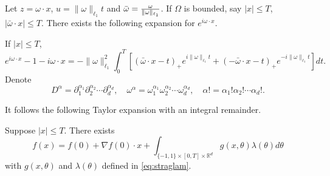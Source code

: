 Let $z=\omega\cdot x$, $u=\|\omega\|_{\ell_1}t$ and $\bar \omega={\omega\over \|\omega\|_{\ell_1}}$. If $\Omega$ is bounded, say $|x|\le T$, $|\bar \omega \cdot x|\le T$. There exists the following expansion for $e^{i\omega\cdot x}$.
\begin{lemma}\label{lm:talorcomplex}
If $|x|\le T$,
\begin{equation}  
e^{i\omega\cdot x} - 1 -  i\omega\cdot x 
= 
- \|\omega\|_{\ell_1}^2\int_{0}^T\left[(\bar \omega\cdot x - t)_+e^{i\|\omega\|_{\ell_1}t}
+ (-\bar \omega\cdot x - t)_+e^{-i\|\omega\|_{\ell_1}t} \right]dt.
\end{equation} 
Denote 
$$
D^\alpha = \partial_1^{\alpha_1}\partial_2^{\alpha_2}\cdots \partial_d^{\alpha_d},\quad \omega^\alpha = \omega_1^{\alpha_1}\omega_2^{\alpha_2}\cdots \omega_d^{\alpha_d},\quad \alpha!=\alpha_1!\alpha_2!\cdots \alpha_d!.
$$
\end{lemma}
It follows  the following Taylor expansion with an integral remainder.
\begin{lemma}\label{lm:probabilityexpan}
Suppose $|x|\le T$. There exists
\begin{equation}
f(x) = f(0) + \nabla f(0)\cdot x
+  \int_{\{-1,1\}\times [0,T]\times \mathbb{R}^{d}}  g(x, \theta)\lambda(\theta)d\theta  
\end{equation}  
with  $g(x,\theta)$ and $\lambda(\theta)$ defined in \eqref{eq:straglam}.
\end{lemma}
